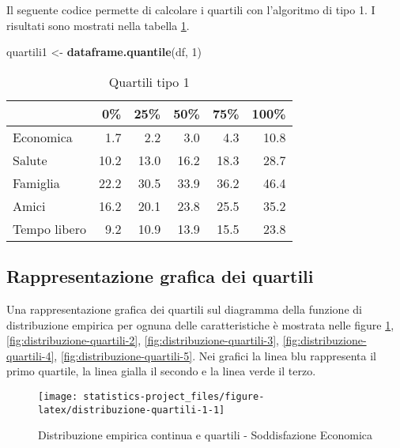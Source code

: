 \documentclass[]{book}
\newenvironment{Shaded}{\begin{snugshade}}{\end{snugshade}}
\newcommand{\KeywordTok}[1]{\textcolor[rgb]{0.13,0.29,0.53}{\textbf{#1}}}
\newcommand{\DecValTok}[1]{\textcolor[rgb]{0.00,0.00,0.81}{#1}}
\newcommand{\StringTok}[1]{\textcolor[rgb]{0.31,0.60,0.02}{#1}}
\newcommand{\NormalTok}[1]{#1}
\begin{document}
Il seguente codice permette di calcolare i quartili con l'algoritmo di
tipo 1. I risultati sono mostrati nella tabella \ref{tab:quartili1}.

\begin{Shaded}
\begin{Highlighting}[]
\NormalTok{quartili1 <-}\StringTok{ }\KeywordTok{dataframe.quantile}\NormalTok{(df, }\DecValTok{1}\NormalTok{)}
\end{Highlighting}
\end{Shaded}

\begin{table}

\caption{\label{tab:quartili1}Quartili tipo 1}
\centering
\begin{tabular}[t]{l|r|r|r|r|r}
\hline
  & 0\% & 25\% & 50\% & 75\% & 100\%\\
\hline
Economica & 1.7 & 2.2 & 3.0 & 4.3 & 10.8\\
\hline
Salute & 10.2 & 13.0 & 16.2 & 18.3 & 28.7\\
\hline
Famiglia & 22.2 & 30.5 & 33.9 & 36.2 & 46.4\\
\hline
Amici & 16.2 & 20.1 & 23.8 & 25.5 & 35.2\\
\hline
Tempo libero & 9.2 & 10.9 & 13.9 & 15.5 & 23.8\\
\hline
\end{tabular}
\end{table}

\subsection{Rappresentazione grafica dei
quartili}\label{rappresentazione-grafica-dei-quartili}

Una rappresentazione grafica dei quartili sul diagramma della funzione
di distribuzione empirica per ognuna delle caratteristiche è mostrata
nelle figure \ref{fig:distribuzione-quartili-1},
\ref{fig:distribuzione-quartili-2}, \ref{fig:distribuzione-quartili-3},
\ref{fig:distribuzione-quartili-4}, \ref{fig:distribuzione-quartili-5}.
Nei grafici la linea blu rappresenta il primo quartile, la linea gialla
il secondo e la linea verde il terzo.

\begin{figure}

{\centering \texttt{[image: statistics-project\_files/figure-latex/distribuzione-quartili-1-1]} 

}

\caption{Distribuzione empirica continua e quartili - Soddisfazione Economica}\label{fig:distribuzione-quartili-1}
\end{figure}
\end{document}
